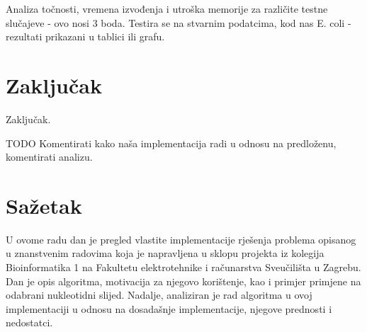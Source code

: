 \documentclass[times, utf8, seminar, numeric]{fer}
\begin{document}
Analiza točnosti, vremena izvođenja i utroška memorije za različite testne slučajeve - ovo nosi 3 boda. Testira se na stvarnim podatcima, kod nas E. coli - rezultati prikazani u tablici ili grafu.

\chapter{Zaključak}
Zaključak.

TODO Komentirati kako naša implementacija radi u odnosu na predloženu, komentirati analizu.




\chapter{Sažetak}

U ovome radu dan je pregled vlastite implementacije rješenja problema opisanog u znanstvenim radovima koja je napravljena u sklopu projekta iz kolegija Bioinformatika 1 na Fakultetu elektrotehnike i računarstva Sveučilišta u Zagrebu. Dan je opis algoritma, motivacija za njegovo korištenje, kao i primjer primjene na odabrani nukleotidni slijed. Nadalje, analiziran je rad algoritma u ovoj implementaciji u odnosu na dosadašnje implementacije, njegove prednosti i nedostatci. \\
\end{document}
